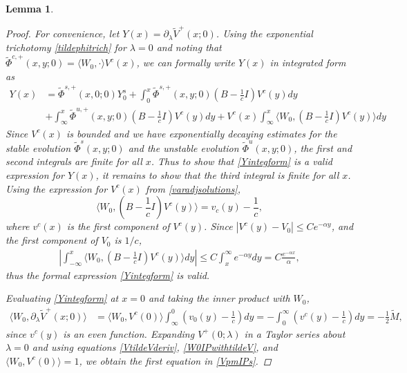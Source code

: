 \documentclass[10pt,reqno]{amsart}
\theoremstyle{plain}
\newtheorem{lemma}[theorem]{Lemma}
\theoremstyle{definition}
\theoremstyle{remark}
\numberwithin{theorem}{section}
\numberwithin{equation}{section}
\begin{document}
\begin{lemma}
\begin{proof}
For convenience, let $Y(x) = \partial_\lambda \tilde{V}^+(x; 0)$. Using the exponential trichotomy \cref{tildephitrich} for $\lambda = 0$ and noting that $\tilde{\Phi}^{c,+}(x, y; 0) = \langle W_0, \cdot \rangle V^c(x)$, we can formally write $Y(x)$ in integrated form as
\begin{equation}\label{Yintegform}
\begin{aligned}
Y(x) &= \tilde{\Phi}^{s,+}(x,0; 0)Y_0^s 
+ \int_0^x \tilde{\Phi}^{s,+}(x,y; 0)\left( B - \frac{1}{c}I \right) V^c(y) dy \\
&+ \int_{\infty}^x \tilde{\Phi}^{u,+}(x,y; 0)\left( B - \frac{1}{c}I \right) V^c(y) dy + V^c(x) \int_{\infty}^x \langle W_0, \left( B - \frac{1}{c}I \right) V^c(y) \rangle dy 
\end{aligned}
\end{equation}
Since $V^c(x)$ is bounded and we have exponentially decaying estimates for the stable evolution $\tilde{\Phi}^s(x,y; 0)$ and the unstable evolution $\tilde{\Phi}^u(x,y; 0)$, the first and second integrals are finite for all $x$. Thus to show that \cref{Yintegform} is a valid expression for $Y(x)$, it remains to show that the third integral is finite for all $x$. Using the expression for $V^c(x)$ from \cref{varadjsolutions}, 
\[
\langle W_0, \left( B - \frac{1}{c}I \right) V^c(y) \rangle = v_c(y) - \frac{1}{c},
\]
where $v^c(x)$ is the first component of $V^c(y)$. Since $|V^c(y) - V_0|\leq C e^{-\alpha y}$, and the first component of $V_0$ is $1/c$, 
\begin{align*}
\left| \int_{-\infty}^x \langle W_0, \left( B - \frac{1}{c}I \right) V^c(y) \rangle dy \right| 
\leq C \int_x^{\infty} e^{-\alpha y} dy = C \frac{e^{-\alpha x}}{\alpha},
\end{align*}
thus the formal expression \cref{Yintegform} is valid. 

Evaluating \cref{Yintegform} at $x = 0$ and taking the inner product with $W_0$, 
\begin{align}\label{W0IPwithtildeV}
\langle W_0, \partial_\lambda \tilde{V}^+(x; 0) \rangle
&= \langle W_0, V^c(0) \rangle \int_{\infty}^0 \left(v_0(y) - \frac{1}{c}\right) dy 
= -\int_0^{\infty} \left(v^c(y) - \frac{1}{c}\right) dy = -\frac{1}{2} \tilde{M},
\end{align}
since $v^c(y)$ is an even function. Expanding $V^+(0; \lambda)$ in a Taylor series about $\lambda = 0$ and using equations \cref{VtildeVderiv}, \cref{W0IPwithtildeV}, and $\langle W_0, V^c(0)\rangle = 1$, we obtain the first equation in \cref{VpmIPs}.


\end{proof}
\end{lemma}
\end{document}
